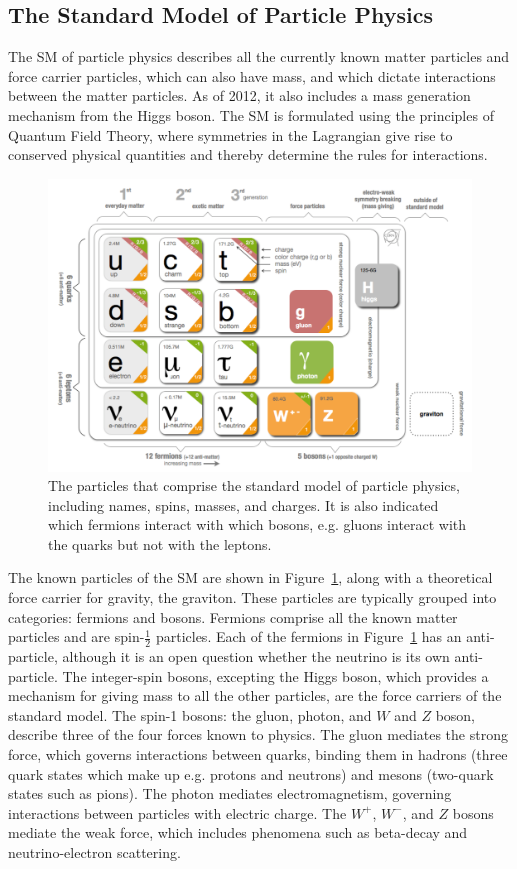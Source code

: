 \subsection{The Standard Model of Particle Physics}
The \ac{SM} of particle physics describes all the currently known matter particles and force carrier particles, which can also have mass, and which dictate interactions between the matter particles. As of 2012, it also includes a mass generation mechanism from the Higgs boson. The \ac{SM} is formulated using the principles of Quantum Field Theory, where symmetries in the Lagrangian give rise to conserved physical quantities and thereby determine the rules for interactions.

\begin{figure}[htbp]
\begin{center}
\includegraphics[width=\textwidth]{figures/theory/sm.png}
\caption{The particles that comprise the standard model of particle physics, including names, spins, masses, and charges. It is also indicated which fermions interact with which bosons, e.g. gluons interact with the quarks but not with the leptons. }
\label{fig:sm}
\end{center}
\end{figure}


The known particles of the \ac{SM} are shown in Figure~\ref{fig:sm}, along with a theoretical force carrier for gravity, the graviton. These particles are typically grouped into categories: fermions and bosons. Fermions comprise all the known matter particles and are spin-$\frac{1}{2}$ particles. Each of the fermions in Figure~\ref{fig:sm} has an anti-particle, although it is an open question whether the neutrino is its own anti-particle. The integer-spin bosons, excepting the Higgs boson, which provides a mechanism for giving mass to all the other particles, are the force carriers of the standard model. The spin-1 bosons: the gluon, photon, and $W$ and $Z$ boson, describe three of the four forces known to physics. The gluon mediates the strong force, which governs interactions between quarks, binding them in hadrons (three quark states which make up e.g. protons and neutrons) and mesons (two-quark states such as pions). The photon mediates electromagnetism, governing interactions between particles with electric charge. The $W^{+}$, $W^{-}$, and $Z$ bosons mediate the weak force, which includes phenomena such as beta-decay and neutrino-electron scattering.

